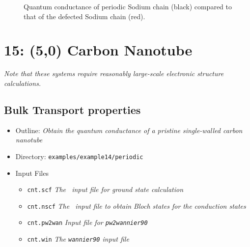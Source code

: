 \documentclass[a4paper,11pt,twoside]{article}
\begin{document}
\begin{figure}[h]
\begin{center}
\caption{Quantum conductance of periodic Sodium chain (black) compared to that of the defected Sodium chain (red).}
\label{fig:Na_qc}
\end{center}
\end{figure}

\cleardoublepage

\section*{15: (5,0) Carbon Nanotube}

\emph{Note that these systems require reasonably large-scale electronic 
structure calculations.}

\subsection*{Bulk Transport properties}

\begin{itemize}
  \item{Outline: \it{Obtain the quantum conductance of a pristine single-walled carbon nanotube}}
  \item{Directory: {\tt examples/example14/periodic}}
  \item{Input Files}
    \begin{itemize}
      \item{ {\tt cnt.scf}  {\it The \pwscf\ input file for ground state
	  calculation}}
      \item{ {\tt cnt.nscf}  {\it The \pwscf\ input file to obtain Bloch
	  states for the conduction states}} 
      \item{ {\tt cnt.pw2wan}  {\it Input file for {\tt pw2wannier90}}}
      \item{ {\tt cnt.win}  {\it The {\tt wannier90} input file}}
    \end{itemize}
\end{itemize}
\end{document}

